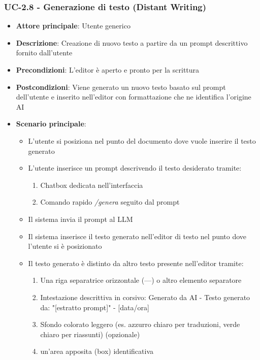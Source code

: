 \documentclass[11pt,a4paper]{article}
\begin{document}
\subsubsection{UC-2.8 - Generazione di testo (Distant Writing)}
\begin{itemize}
    \item \textbf{Attore principale}: Utente generico
    \item \textbf{Descrizione}: Creazione di nuovo testo a partire da un prompt descrittivo fornito dall'utente
    \item \textbf{Precondizioni}: L'editor è aperto e pronto per la scrittura
    \item \textbf{Postcondizioni}: Viene generato un nuovo testo basato sul prompt dell'utente e inserito nell'editor con formattazione che ne identifica l'origine AI
    \item \textbf{Scenario principale}:
        \begin{itemize}
            \item L'utente si posiziona nel punto del documento dove vuole inserire il testo generato
            \item L'utente inserisce un prompt descrivendo il testo desiderato tramite:
                \begin{enumerate}
                    \item Chatbox dedicata nell'interfaccia
                    \item Comando rapido \textit{/genera} seguito dal prompt
                \end{enumerate}
            \item Il sistema invia il prompt al LLM
            \item Il sistema inserisce il testo generato nell'editor di testo nel punto dove l'utente si è posizionato
            \item Il testo generato è distinto da altro testo presente nell'editor tramite:
                \begin{enumerate}
                    \item Una riga separatrice orizzontale (---) o altro elemento separatore
                    \item Intestazione descrittiva in corsivo: Generato da AI - Testo generato da: "[estratto prompt]" - [data/ora]
                    \item Sfondo colorato leggero (es. azzurro chiaro per traduzioni, verde chiaro per riassunti) (opzionale)
                    \item un’area apposita (box) identificativa

\end{enumerate}
\end{itemize}
\end{itemize}
\end{document}
